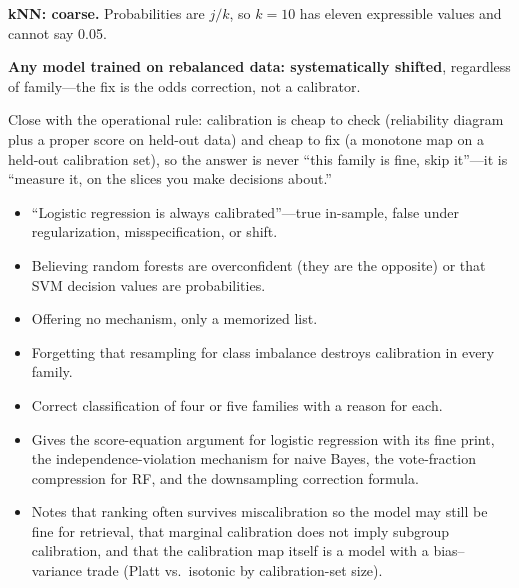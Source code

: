 \begin{interviewq}
\textbf{kNN: coarse.} Probabilities are $j/k$, so $k = 10$ has eleven expressible values and cannot say 0.05.

\textbf{Any model trained on rebalanced data: systematically shifted}, regardless of family---the fix is the odds correction, not a calibrator.

Close with the operational rule: calibration is cheap to check (reliability diagram plus a proper score on held-out data) and cheap to fix (a monotone map on a held-out calibration set), so the answer is never ``this family is fine, skip it''---it is ``measure it, on the slices you make decisions about.''

\redflags
\begin{itemize}
    \item ``Logistic regression is always calibrated''---true in-sample, false under regularization, misspecification, or shift.
    \item Believing random forests are overconfident (they are the opposite) or that SVM decision values are probabilities.
    \item Offering no mechanism, only a memorized list.
    \item Forgetting that resampling for class imbalance destroys calibration in every family.
\end{itemize}


\goodgreat
\begin{itemize}
    \item {} Correct classification of four or five families with a reason for each.
    \item {} Gives the score-equation argument for logistic regression with its fine print, the independence-violation mechanism for naive Bayes, the vote-fraction compression for RF, and the downsampling correction formula.
    \item {} Notes that ranking often survives miscalibration so the model may still be fine for retrieval, that marginal calibration does not imply subgroup calibration, and that the calibration map itself is a model with a bias--variance trade (Platt vs.\ isotonic by calibration-set size).
\end{itemize}

\end{interviewq}


